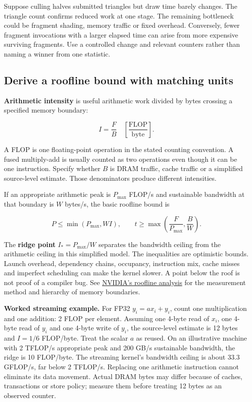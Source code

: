 Suppose culling halves submitted triangles but draw time barely changes. The triangle count confirms reduced work at one stage. The remaining bottleneck could be fragment shading, memory traffic or fixed overhead. Conversely, fewer fragment invocations with a larger elapsed time can arise from more expensive surviving fragments. Use a controlled change and relevant counters rather than naming a winner from one statistic.

\subsection{Derive a roofline bound with matching units}\label{03-visual-computing-i-ch016-derive-a-roofline-bound-with-matching-units}

\hypertarget{03-visual-computing-i-ch016-derive-a-roofline-bound-with-matching-units}{}

\textbf{Arithmetic intensity} is useful arithmetic work divided by bytes crossing a specified memory boundary:

\[
I=\frac{F}{B}\quad\left[\frac{\mathrm{FLOP}}{\mathrm{byte}}\right].
\]

A FLOP is one floating-point operation in the stated counting convention. A fused multiply-add is usually counted as two operations even though it can be one instruction. Specify whether \(B\) is DRAM traffic, cache traffic or a simplified source-level estimate. Those denominators produce different intensities.

If an appropriate arithmetic peak is \(P_{\max}\) FLOP/s and sustainable bandwidth at that boundary is \(W\) bytes/s, the basic roofline bound is

\[
P\leq\min(P_{\max},WI),\qquad
t\geq\max\left(\frac{F}{P_{\max}},\frac{B}{W}\right).
\]

The \textbf{ridge point} \(I_*=P_{\max}/W\) separates the bandwidth ceiling from the arithmetic ceiling in this simplified model. The inequalities are optimistic bounds. Launch overhead, dependency chains, occupancy, instruction mix, cache misses and imperfect scheduling can make the kernel slower. A point below the roof is not proof of a compiler bug. See \href{https://developer.nvidia.com/blog/accelerating-hpc-applications-with-nsight-compute-roofline-analysis/}{NVIDIA's roofline analysis} for the measurement method and hierarchy of memory boundaries.

\textbf{Worked streaming example.} For FP32 \(y_i=a x_i+y_i\), count one multiplication and one addition: 2 FLOP per element. Assuming one 4-byte read of \(x_i\), one 4-byte read of \(y_i\) and one 4-byte write of \(y_i\), the source-level estimate is 12 bytes and \(I=1/6\) FLOP/byte. Treat the scalar \(a\) as reused. On an illustrative machine with 2 TFLOP/s appropriate peak and 200 GB/s sustainable bandwidth, the ridge is 10 FLOP/byte. The streaming kernel's bandwidth ceiling is about 33.3 GFLOP/s, far below 2 TFLOP/s. Replacing one arithmetic instruction cannot eliminate its data movement. Actual DRAM bytes may differ because of caches, transactions or store policy; measure them before treating 12 bytes as an observed counter.

